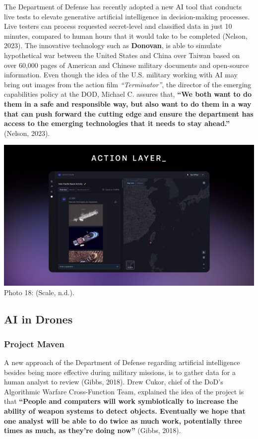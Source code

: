 \documentclass[
]{article}
\begin{document}
The Department of Defense has recently adopted a new AI tool that conducts live tests to elevate generative artificial intelligence in decision-making processes. Live testers can process requested secret-level and classified data in just 10 minutes, compared to human hours that it would take to be completed (Nelson, 2023).
The innovative technology such as \textbf{Donovan}, is able to simulate hypothetical war between the United States and China over Taiwan based on over 60,000 pages of American and Chinese military documents and open-source information. Even though the idea of the U.S. military working with AI may bring out images from the action film \emph{``Terminator''}, the director of the emerging capabilities policy at the DOD, Michael C. assures that, \textbf{``We both want to do them in a safe and responsible way, but also want to do them in a way that can push forward the cutting edge and ensure the department has access to the emerging technologies that it needs to stay ahead.''} (Nelson, 2023).

\includegraphics{Donovan.jpg}
Photo 18: (Scale, n.d.).

\hypertarget{ai-in-drones}{%
\subsection{AI in Drones}\label{ai-in-drones}}

\hypertarget{project-maven}{%
\subsubsection{Project Maven}\label{project-maven}}

A new approach of the Department of Defense regarding artificial intelligence besides being more effective during military missions, is to gather data for a human analyst to review (Gibbs, 2018). Drew Cukor, chief of the DoD's Algorithmic Warfare Cross-Function Team, explained the idea of the project is that \textbf{``People and computers will work symbiotically to increase the ability of weapon systems to detect objects. Eventually we hope that one analyst will be able to do twice as much work, potentially three times as much, as they're doing now''} (Gibbs, 2018).
\end{document}
